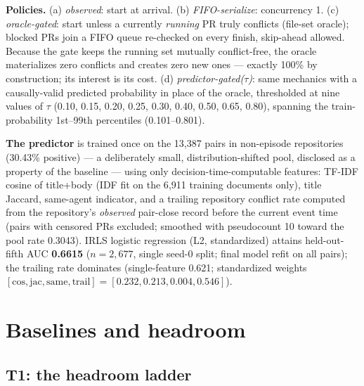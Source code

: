 \documentclass{article}
\begin{document}
\textbf{Policies.} (a) \emph{observed}: start at arrival. (b) \emph{FIFO-serialize}: concurrency 1. (c) \emph{oracle-gated}: start unless a currently \emph{running} PR truly conflicts (file-set oracle); blocked PRs join a FIFO queue re-checked on every finish, skip-ahead allowed. Because the gate keeps the running set mutually conflict-free, the oracle materializes zero conflicts and creates zero new ones --- exactly 100\% by construction; its interest is its cost. (d) \emph{predictor-gated($\tau$)}: same mechanics with a causally-valid predicted probability in place of the oracle, thresholded at nine values of $\tau$ (0.10, 0.15, 0.20, 0.25, 0.30, 0.40, 0.50, 0.65, 0.80), spanning the train-probability 1st--99th percentiles (0.101--0.801). %

\textbf{The predictor} is trained once on the 13{,}387 pairs in non-episode repositories (30.43\% positive) --- a deliberately small, distribution-shifted pool, disclosed as a property of the baseline --- using only decision-time-computable features: TF-IDF cosine of title+body (IDF fit on the 6{,}911 training documents only), title Jaccard, same-agent indicator, and a trailing repository conflict rate computed from the repository's \emph{observed} pair-close record before the current event time (pairs with censored PRs excluded; smoothed with pseudocount 10 toward the pool rate 0.3043). %
IRLS logistic regression (L2, standardized) attains held-out-fifth AUC \textbf{0.6615} ($n{=}2{,}677$, single seed-0 split; final model refit on all pairs); the trailing rate dominates (single-feature 0.621; standardized weights $[\text{cos}, \text{jac}, \text{same}, \text{trail}] = [0.232, 0.213, 0.004, 0.546]$). %

\section{Baselines and headroom}
\label{sec:results}

\subsection{T1: the headroom ladder}
\label{sec:results-t1}
\end{document}
